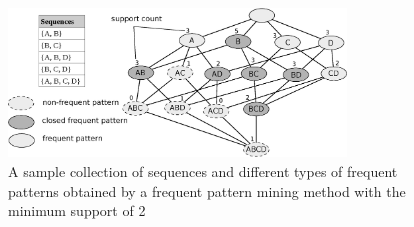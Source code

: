 \documentclass[smallextended]{svjour3}       %
\begin{document}
\begin{figure}
\centering
\includegraphics[width=0.8\textwidth]{figures/fpm.eps}
\caption{A sample collection of sequences and different types of frequent patterns obtained by a frequent pattern mining method with the minimum support of 2}
\label{fig:fpm}
\end{figure}
\end{document}
